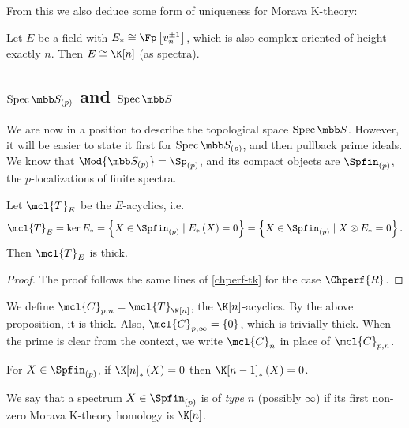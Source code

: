 From this we also deduce some form of uniqueness for Morava K-theory:

\begin{corollary}
	Let $E$ be a field with $E_* \cong \Fp\left[v_n^{\pm 1}\right]$, which is also complex oriented of height exactly $n$.
	Then $E \cong \K[n]$ (as spectra).
\end{corollary}



\subsection{\texorpdfstring{$\spec \SS_{\left(p\right)}$}{spec S(p)} and \texorpdfstring{$\spec \SS$}{spec S}}

We are now in a position to describe the topological space $\spec \SS$.
However, it will be easier to state it first for $\spec \SS_{\left(p\right)}$, and then pullback prime ideals.
We know that $\Mod{\SS_{\left(p\right)}} = \Sp_{\left(p\right)}$, and its compact objects are $\Spfin_{\left(p\right)}$, the $p$-localizations of finite spectra.

\begin{proposition}
	Let $\mcl{T}_E$ be the $E$-acyclics, i.e.
	$$
	\mcl{T}_E
	= \ker E_*
	= \left\{ X \in \Spfin_{\left(p\right)} \mid E_*\left(X\right)=0 \right\}
	= \left\{ X \in \Spfin_{\left(p\right)} \mid X \otimes E_*=0 \right\}.
	$$
	Then $\mcl{T}_E$ is thick.
\end{proposition}

\begin{proof}
	The proof follows the same lines of \ref{chperf-tk} for the case $\Chperf{R}$.
\end{proof}

\begin{definition}
	We define $\mcl{C}_{p, n} = \mcl{T}_{\K[n]}$, the $\K[n]$-acyclics.
	By the above proposition, it is thick.
	Also, $\mcl{C}_{p, \infty} = \left\{ 0\right\}$, which is trivially thick.
	When the prime is clear from the context, we write $\mcl{C}_n$ in place of $\mcl{C}_{p, n}$.
\end{definition}

\begin{proposition}
	For $X \in \Spfin_{\left(p\right)}$, if $\K[n]_*\left(X\right) = 0$ then $\K[n-1]_*\left(X\right) = 0$.
\end{proposition}

\begin{definition}
	We say that a spectrum $X \in \Spfin_{\left(p\right)}$ is of \emph{type} $n$ (possibly $\infty$) if its first non-zero Morava K-theory homology is $\K[n]$.
\end{definition}


